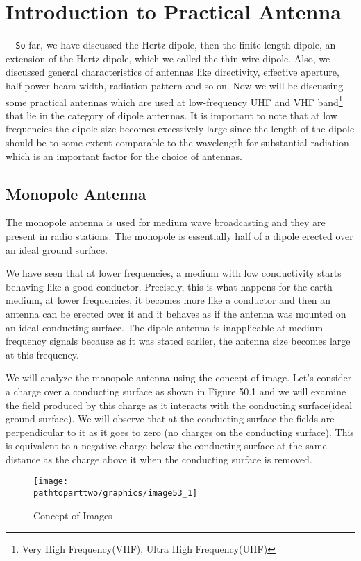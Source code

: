 \chapter{Introduction to Practical Antenna}
\verb|	So| far, we have discussed the Hertz dipole, then the finite length dipole, an extension of the Hertz dipole, which we called the thin wire dipole. Also, we discussed general characteristics of antennas like directivity, effective aperture, half-power beam width, radiation pattern and so on. Now we will be discussing some practical antennas which are used at low-frequency UHF and VHF band\footnote{Very High Frequency(VHF), Ultra High Frequency(UHF)} that lie in the category of dipole antennas. It is important to note that at low frequencies the dipole size becomes excessively large since the length of the dipole should be to some extent comparable to the wavelength for substantial radiation which is an important factor for the choice of antennas.


\section{Monopole Antenna}The monopole antenna is used for medium wave broadcasting and they are present in radio stations. The monopole is essentially half of a dipole erected over an ideal ground surface.

We have seen that at lower frequencies, a medium with low conductivity starts behaving like a good conductor. Precisely, this is what happens for the earth medium, at lower frequencies, it becomes more like a conductor and then an antenna can be erected over it and it behaves as if the antenna was mounted on an ideal conducting surface. The dipole antenna is inapplicable at medium-frequency signals because as it was stated earlier, the antenna size becomes large at this frequency.

We will analyze the monopole antenna using the concept of image. Let's consider a charge over a conducting surface as shown in Figure 50.1 and we will examine the field produced by this charge as it interacts with the conducting surface(ideal ground surface). We will observe that at the conducting surface the fields are perpendicular to it as it goes to zero (no charges on the conducting surface). This is equivalent to a negative charge below the conducting surface at the same distance as the charge above it when the conducting surface is removed. 
\begin{figure}[h]
\centering
\texttt{[image: \\pathtoparttwo/graphics/image53\_1]}
\caption{Concept of Images}
\label{fig:fig50.1}
\end{figure}

